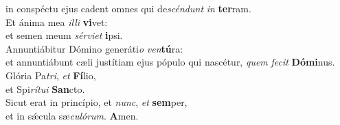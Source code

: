 \evenverse in conspéctu ejus cadent omnes qui de\textit{scén}\textit{dunt} \textit{in} \textbf{ter}ram.\\
\oddverse Et ánima mea \textit{il}\textit{li} \textbf{vi}vet:~\*\\
\oddverse et semen meum \textit{sér}\textit{vi}\textit{et} \textbf{i}psi.\\
\evenverse Annuntiábitur Dómino generáti\textit{o} \textit{ven}\textbf{tú}ra:~\*\\
\evenverse et annuntiábunt cæli justítiam ejus pópulo qui nascétur, \textit{quem} \textit{fe}\textit{cit} \textbf{Dó}\textbf{mi}nus.\\
\oddverse Glória Pa\textit{tri}, \textit{et} \textbf{Fí}lio,~\*\\
\oddverse et Spi\textit{rí}\textit{tu}\textit{i} \textbf{San}cto.\\
\evenverse Sicut erat in princípio, et \textit{nunc}, \textit{et} \textbf{sem}per,~\*\\
\evenverse et in sǽcula sæ\textit{cu}\textit{ló}\textit{rum}. \textbf{A}men.\\
